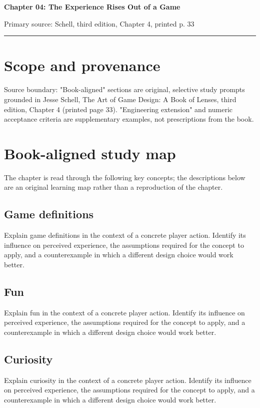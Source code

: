 \documentclass[11pt]{article}
\begin{document}
{\huge\bfseries\color{suiteblue} Chapter 04: The Experience Rises Out of a Game}\par
\vspace{0.15in}
{\normalsize\color{suitegray} Primary source: Schell, third edition, Chapter 4, printed p. 33}\par
\vspace{0.15in}\hrule\vspace{0.15in}

\section{Scope and provenance}
Source boundary: "Book-aligned" sections are original, selective study prompts grounded in Jesse Schell, The Art of Game Design: A Book of Lenses, third edition, Chapter 4 (printed page 33). "Engineering extension" and numeric acceptance criteria are supplementary examples, not prescriptions from the book.


\section{Book-aligned study map}
The chapter is read through the following key concepts; the descriptions below are an original learning map rather than a reproduction of the chapter.


\subsection{Game definitions}
Explain game definitions in the context of a concrete player action. Identify its influence on perceived experience, the assumptions required for the concept to apply, and a counterexample in which a different design choice would work better.


\subsection{Fun}
Explain fun in the context of a concrete player action. Identify its influence on perceived experience, the assumptions required for the concept to apply, and a counterexample in which a different design choice would work better.


\subsection{Curiosity}
Explain curiosity in the context of a concrete player action. Identify its influence on perceived experience, the assumptions required for the concept to apply, and a counterexample in which a different design choice would work better.
\end{document}
